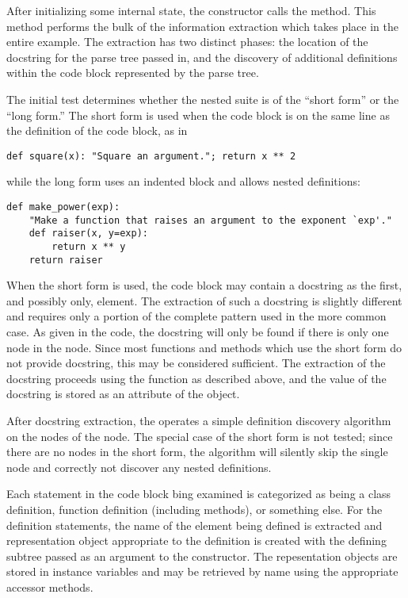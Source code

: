 After initializing some internal state, the constructor calls the
 method.  This method performs the bulk of the
information extraction which takes place in the entire example.  The
extraction has two distinct phases: the location of the docstring for
the parse tree passed in, and the discovery of additional definitions
within the code block represented by the parse tree.

The initial  test determines whether the nested suite is of
the ``short form'' or the ``long form.''  The short form is used when
the code block is on the same line as the definition of the code
block, as in

\begin{verbatim}
def square(x): "Square an argument."; return x ** 2
\end{verbatim}

while the long form uses an indented block and allows nested
definitions:

\begin{verbatim}
def make_power(exp):
    "Make a function that raises an argument to the exponent `exp'."
    def raiser(x, y=exp):
        return x ** y
    return raiser
\end{verbatim}

When the short form is used, the code block may contain a docstring as
the first, and possibly only,  element.  The
extraction of such a docstring is slightly different and requires only
a portion of the complete pattern used in the more common case.  As
given in the code, the docstring will only be found if there is only
one  node in the  node.  Since most
functions and methods which use the short form do not provide
docstring, this may be considered sufficient.  The extraction of the
docstring proceeds using the  function as described
above, and the value of the docstring is stored as an attribute of the
 object.

After docstring extraction, the operates a simple definition discovery
algorithm on the  nodes of the  node.  The
special case of the short form is not tested; since there are no
 nodes in the short form, the algorithm will silently skip
the single  node and correctly not discover any
nested definitions.

Each statement in the code block bing examined is categorized as being
a class definition, function definition (including methods), or
something else.  For the definition statements, the name of the
element being defined is extracted and representation object
appropriate to the definition is created with the defining subtree
passed as an argument to the constructor.  The repesentation objects
are stored in instance variables and may be retrieved by name using
the appropriate accessor methods.

